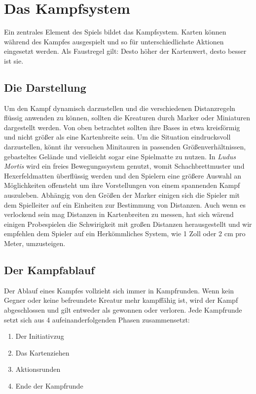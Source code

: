 \chapter{Das Kampfsystem}
Ein zentrales Element des Spiels bildet das Kampfsystem. Karten können während des Kampfes ausgespielt und so für unterschiedlichste Aktionen eingesetzt werden. Als Faustregel gilt: Desto höher der Kartenwert, desto besser ist sie.

\section{Die Darstellung}
Um den Kampf dynamisch darzustellen und die verschiedenen Distanzregeln flüssig anwenden zu können, sollten die Kreaturen durch Marker oder Miniaturen dargestellt werden. Von oben betrachtet sollten ihre Bases in etwa kreisförmig und nicht größer als eine Kartenbreite sein. Um die Situation eindrucksvoll darzustellen, könnt ihr versuchen Minitauren in passenden Größenverhältnissen, gebasteltes Gelände und vielleicht sogar eine Spielmatte zu nutzen. In \textit{Ludus Mortis} wird ein freies Bewegungssystem genutzt, womit Schachbrettmuster und Hexerfeldmatten überflüssig werden und den Spielern eine größere Auswahl an Möglichkeiten offensteht um ihre Vorstellungen von einem spannenden Kampf auszuleben. Abhängig von den Größen der Marker einigen sich die Spieler mit dem Spielleiter auf ein Einheiten zur Bestimmung von Distanzen. Auch wenn es verlockend sein mag Distanzen in Kartenbreiten zu messen, hat sich wärend einigen Probespielen die Schwirigkeit mit großen Distanzen herausgestellt und wir empfehlen dem Spieler auf ein Herkömmliches System, wie 1 Zoll oder 2 cm pro Meter, umzusteigen.


\section{Der Kampfablauf}
Der Ablauf eines Kampfes vollzieht sich immer in Kampfrunden. Wenn kein Gegner oder keine befreundete Kreatur mehr kampffähig ist, wird der Kampf abgeschlossen und gilt entweder als gewonnen oder verloren. Jede Kampfrunde setzt sich aus 4 aufeinanderfolgenden Phasen zusammensetzt:

\begin{enumerate}
    \item Der Initiativzug
    \item Das Kartenziehen 
    \item Aktionsrunden 
    \item Ende der Kampfrunde
\end{enumerate}

